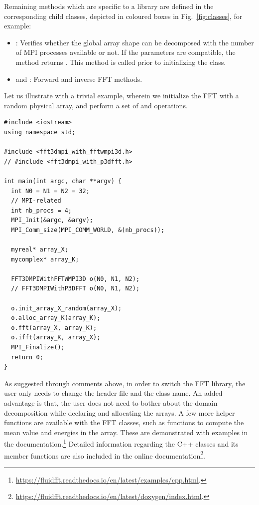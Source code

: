 \documentclass{../jors}
\begin{document}
Remaining methods which are specific to a library are defined in the
corresponding child classes, depicted in coloured boxes in
Fig.~\ref{fig:classes}, for example:

\begin{itemize}
  \item {}: Verifies whether the global array
    shape can be decomposed with the number of MPI processes available or not.
    If the parameters are compatible, the method returns .
    This method is called prior to initializing the class.
  \item {} and : Forward and inverse FFT
    methods.
\end{itemize}

Let us illustrate with a trivial example, wherein we initialize the FFT with a
random physical array, and perform a set of  and 
operations.
\begin{verbatim}
#include <iostream>
using namespace std;

#include <fft3dmpi_with_fftwmpi3d.h>
// #include <fft3dmpi_with_p3dfft.h>

int main(int argc, char **argv) {
  int N0 = N1 = N2 = 32;
  // MPI-related
  int nb_procs = 4;
  MPI_Init(&argc, &argv);
  MPI_Comm_size(MPI_COMM_WORLD, &(nb_procs));

  myreal* array_X;
  mycomplex* array_K;

  FFT3DMPIWithFFTWMPI3D o(N0, N1, N2);
  // FFT3DMPIWithP3DFFT o(N0, N1, N2);

  o.init_array_X_random(array_X);
  o.alloc_array_K(array_K);
  o.fft(array_X, array_K);
  o.ifft(array_K, array_X);
  MPI_Finalize();
  return 0;
}
\end{verbatim}

As suggested through comments above, in order to switch the FFT library, the
user only needs to change the header file and the class name. An added
advantage is that, the user does not need to bother about the domain
decomposition while declaring and allocating the arrays. A few more helper
functions are available with the FFT classes, such as functions to compute the
mean value and energies in the array. These are demonstrated with examples in
the documentation.\footnote{%
\url{https://fluidfft.readthedocs.io/en/latest/examples/cpp.html}.}
%
Detailed information regarding the C++ classes and its member functions are
also included in the online documentation\footnote{%
\url{https://fluidfft.readthedocs.io/en/latest/doxygen/index.html}.}.
\end{document}
